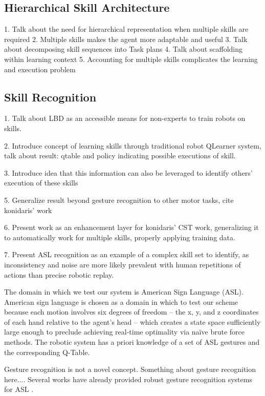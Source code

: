 \documentclass[letterpaper]{article}
\begin{document}
\subsection{Hierarchical Skill Architecture}
\cite{Hierarchical}
1. Talk about the need for hierarchical representation when multiple skills are required
2. Multiple skills makes the agent more adaptable and useful
3. Talk about decomposing skill sequences into Task plans
4. Talk about scaffolding within learning context
5. Accounting for multiple skills complicates the learning and execution problem


\subsection{Skill Recognition}
1. Talk about LBD as an accessible means for non-experts to train robots on skills.

2. Introduce concept of learning skills through traditional robot QLearner system, talk about
    result: qtable and policy indicating possible executions of skill.

3. Introduce idea that this information can also be leveraged to identify others' execution of these skills

5. Generalize result beyond gesture recognition to other motor tasks, cite konidaris' work

6. Present work as an enhancement layer for konidaris' CST work, generalizing it to automatically work for
   multiple skills, properly applying training data.

7. Present ASL recognition as an example of a complex skill set to identify, as inconsistency and noise
   are more likely prevalent with human repetitions of actions than precise robotic replay.


The domain in which we test our system is American Sign Language (ASL).
American sign language is chosen as a domain in which to test our scheme
because each motion involves six degrees of freedom -- the x, y, and z
coordinates of each hand relative to the agent's head -- which creates a
state space sufficiently large enough to preclude achieving real-time
optimality via na\"ive brute force methods.  The
robotic system has a priori knowledge of a set of ASL gestures and the
corresponding Q-Table.

Gesture recognition is not a novel concept.  Something about gesture recognition
here...\cite{HandGestures}\cite{HSMMRecognition}\cite{POMDPGesture}.
Several works have already provided robust gesture recognition systems for
ASL \cite{HoughASL}\cite{ASLRealTime}\cite{MotionASL}.
\end{document}
